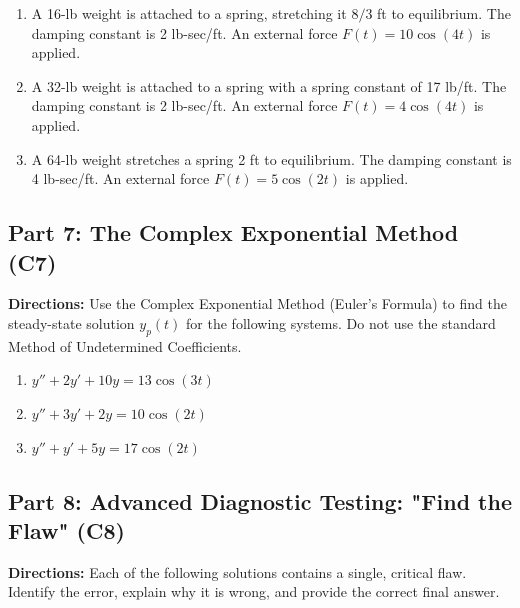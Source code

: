 \documentclass[11pt]{article}
\begin{document}
\begin{enumerate}[label=\textbf{\arabic*.}, resume]
    \item A 16-lb weight is attached to a spring, stretching it $8/3$ ft to equilibrium. The damping constant is 2 lb-sec/ft. An external force $F(t) = 10 \cos(4t)$ is applied. 
    \item A 32-lb weight is attached to a spring with a spring constant of 17 lb/ft. The damping constant is 2 lb-sec/ft. An external force $F(t) = 4 \cos(4t)$ is applied.
    \item A 64-lb weight stretches a spring 2 ft to equilibrium. The damping constant is 4 lb-sec/ft. An external force $F(t) = 5 \cos(2t)$ is applied.
\end{enumerate}

\subsection*{Part 7: The Complex Exponential Method (C7)}
\noindent \textbf{Directions:} Use the Complex Exponential Method (Euler's Formula) to find the steady-state solution $y_p(t)$ for the following systems. Do not use the standard Method of Undetermined Coefficients.

\begin{enumerate}[label=\textbf{\arabic*.}, resume]
    \item $y'' + 2y' + 10y = 13 \cos(3t)$
    \item $y'' + 3y' + 2y = 10 \cos(2t)$
    \item $y'' + y' + 5y = 17 \cos(2t)$
\end{enumerate}

\subsection*{Part 8: Advanced Diagnostic Testing: "Find the Flaw" (C8)}
\noindent \textbf{Directions:} Each of the following solutions contains a single, critical flaw. Identify the error, explain why it is wrong, and provide the correct final answer.
\end{document}
